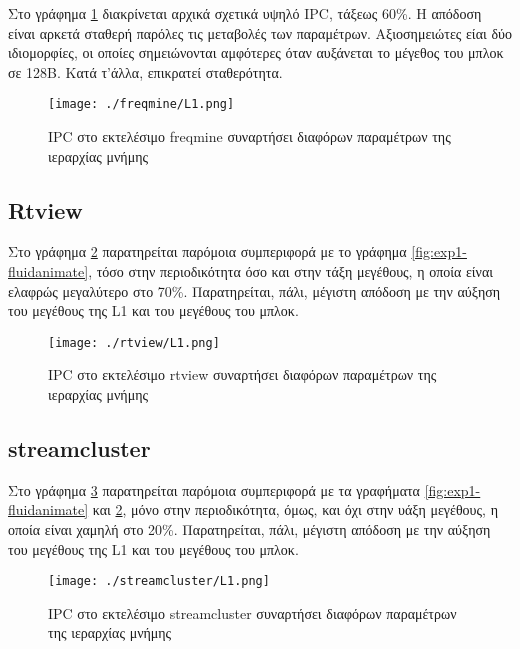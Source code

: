\documentclass{article}
\newcommand{\eng}[1]{\foreignlanguage{english}{#1}}
\begin{document}
Στο γράφημα \ref{fig:exp1-freqmine} διακρίνεται αρχικά σχετικά υψηλό \eng{IPC}, τάξεως 60\%. Η απόδοση είναι αρκετά σταθερή παρόλες τις μεταβολές των παραμέτρων. Αξιοσημειώτες είαι δύο ιδιομορφίες, οι οποίες σημειώνονται αμφότερες όταν αυξάνεται το μέγεθος του μπλοκ σε 128Β. Κατά τ'άλλα, επικρατεί σταθερότητα.

\begin{figure}[h]
    \centering
    \texttt{[image: ./freqmine/L1.png]} 
    \caption{\eng{IPC} στο εκτελέσιμο \eng{freqmine} συναρτήσει διαφόρων παραμέτρων της ιεραρχίας μνήμης}
    \label{fig:exp1-freqmine}
\end{figure}
\FloatBarrier

\clearpage
\subsection{\eng{Rtview}}

Στο γράφημα \ref{fig:exp1-rtview} παρατηρείται παρόμοια συμπεριφορά με το γράφημα \ref{fig:exp1-fluidanimate}, τόσο στην περιοδικότητα όσο και στην τάξη μεγέθους, η οποία είναι ελαφρώς μεγαλύτερο στο 70\%. Παρατηρείται, πάλι, μέγιστη απόδοση με την αύξηση του μεγέθους της \eng{L1} και του μεγέθους του μπλοκ.

\begin{figure}[h]
    \centering
    \texttt{[image: ./rtview/L1.png]} 
    \caption{\eng{IPC} στο εκτελέσιμο \eng{rtview} συναρτήσει διαφόρων παραμέτρων της ιεραρχίας μνήμης}
    \label{fig:exp1-rtview}
\end{figure}
\FloatBarrier

\clearpage
\subsection{\eng{streamcluster}}

Στο γράφημα \ref{fig:exp1-streamcluster} παρατηρείται παρόμοια συμπεριφορά με τα γραφήματα \ref{fig:exp1-fluidanimate} και \ref{fig:exp1-rtview}, μόνο στην περιοδικότητα, όμως, και όχι στην υάξη μεγέθους, η οποία είναι χαμηλή στο 20\%. Παρατηρείται, πάλι, μέγιστη απόδοση με την αύξηση του μεγέθους της \eng{L1} και του μεγέθους του μπλοκ.

\begin{figure}[h]
    \centering
    \texttt{[image: ./streamcluster/L1.png]} 
    \caption{\eng{IPC} στο εκτελέσιμο \eng{streamcluster} συναρτήσει διαφόρων παραμέτρων της ιεραρχίας μνήμης}
    \label{fig:exp1-streamcluster}
\end{figure}
\FloatBarrier
\end{document}
